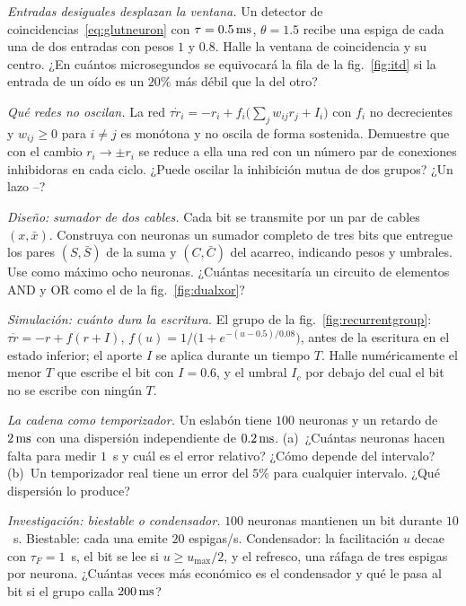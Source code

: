 \begin{exercise}[\lvlB]
\label{ex:02:2}
\emph{Entradas desiguales desplazan la ventana.} Un detector de coincidencias~\eqref{eq:glutneuron} con $\tau=0.5\,\text{ms}$, $\theta=1.5$ recibe una espiga de cada una de dos entradas con pesos $1$ y $0.8$. Halle la ventana de coincidencia y su centro. ¿En cuántos microsegundos se equivocará la fila de la fig.~\ref{fig:itd} si la entrada de un oído es un $20\%$ más débil que la del otro?
\end{exercise}

\begin{exercise}[\lvlB]
\label{ex:02:3}
\emph{Qué redes no oscilan.} La red $\tau\dot r_i=-r_i+f_i\bigl(\textstyle\sum_jw_{ij}r_j+I_i\bigr)$ con $f_i$ no decrecientes y $w_{ij}\ge0$ para $i\ne j$ es monótona y no oscila de forma sostenida. Demuestre que con el cambio $r_i\to\pm r_i$ se reduce a ella una red con un número par de conexiones inhibidoras en cada ciclo. ¿Puede oscilar la inhibición mutua de dos grupos? ¿Un lazo --?
\end{exercise}

\begin{exercise}[\lvlB]
\label{ex:02:4}
\emph{Diseño: sumador de dos cables.} Cada bit se transmite por un par de cables $(x,\bar x)$. Construya con neuronas  un sumador completo de tres bits que entregue los pares $(S,\bar S)$ de la suma y $(C,\bar C)$ del acarreo, indicando pesos y umbrales. Use como máximo ocho neuronas. ¿Cuántas necesitaría un circuito de elementos AND y OR como el de la fig.~\ref{fig:dualxor}?
\end{exercise}

\begin{exercise}[\lvlB]
\label{ex:02:5}
\emph{Simulación: cuánto dura la escritura.} El grupo de la fig.~\ref{fig:recurrentgroup}: $\tau\dot r=-r+f(r+I)$, $f(u)=1/\bigl(1+e^{-(u-0.5)/0.08}\bigr)$, antes de la escritura en el estado inferior; el aporte $I$ se aplica durante un tiempo $T$. Halle numéricamente el menor $T$ que escribe el bit con $I=0.6$, y el umbral $I_c$ por debajo del cual el bit no se escribe con ningún $T$.
\end{exercise}

\begin{exercise}[\lvlA]
\label{ex:02:6}
\emph{La cadena como temporizador.} Un eslabón tiene $100$ neuronas  y un retardo de $2\,\text{ms}$ con una dispersión independiente de $0.2\,\text{ms}$. (a)~¿Cuántas neuronas hacen falta para medir $1$~s y cuál es el error relativo? ¿Cómo depende del intervalo? (b)~Un temporizador real tiene un error del $5\%$ para cualquier intervalo. ¿Qué dispersión lo produce?
\end{exercise}

\begin{exercise}[\lvlC]
\label{ex:02:7}
\emph{Investigación: biestable o condensador.} $100$ neuronas mantienen un bit durante $10$~s. Biestable: cada una emite $20$ espigas/s. Condensador: la facilitación $u$ decae con $\tau_F=1$~s, el bit se lee si $u\ge u_{\max}/2$, y el refresco, una ráfaga de tres espigas por neurona. ¿Cuántas veces más económico es el condensador y qué le pasa al bit si el grupo calla $200\,\text{ms}$?
\end{exercise}
